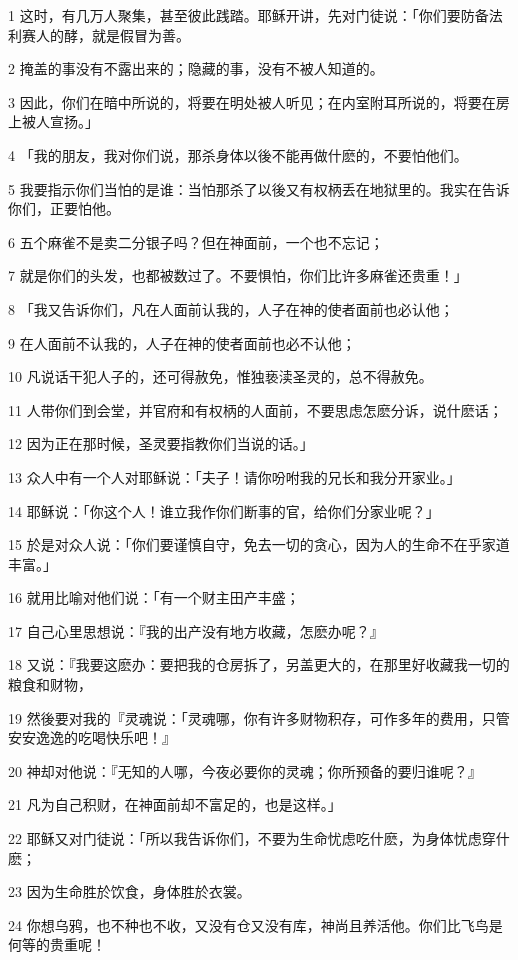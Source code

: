 \par 1 这时，有几万人聚集，甚至彼此践踏。耶稣开讲，先对门徒说：「你们要防备法利赛人的酵，就是假冒为善。
\par 2 掩盖的事没有不露出来的；隐藏的事，没有不被人知道的。
\par 3 因此，你们在暗中所说的，将要在明处被人听见；在内室附耳所说的，将要在房上被人宣扬。」
\par 4 「我的朋友，我对你们说，那杀身体以後不能再做什麽的，不要怕他们。
\par 5 我要指示你们当怕的是谁：当怕那杀了以後又有权柄丢在地狱里的。我实在告诉你们，正要怕他。
\par 6 五个麻雀不是卖二分银子吗？但在神面前，一个也不忘记；
\par 7 就是你们的头发，也都被数过了。不要惧怕，你们比许多麻雀还贵重！」
\par 8 「我又告诉你们，凡在人面前认我的，人子在神的使者面前也必认他；
\par 9 在人面前不认我的，人子在神的使者面前也必不认他；
\par 10 凡说话干犯人子的，还可得赦免，惟独亵渎圣灵的，总不得赦免。
\par 11 人带你们到会堂，并官府和有权柄的人面前，不要思虑怎麽分诉，说什麽话；
\par 12 因为正在那时候，圣灵要指教你们当说的话。」
\par 13 众人中有一个人对耶稣说：「夫子！请你吩咐我的兄长和我分开家业。」
\par 14 耶稣说：「你这个人！谁立我作你们断事的官，给你们分家业呢？」
\par 15 於是对众人说：「你们要谨慎自守，免去一切的贪心，因为人的生命不在乎家道丰富。」
\par 16 就用比喻对他们说：「有一个财主田产丰盛；
\par 17 自己心里思想说：『我的出产没有地方收藏，怎麽办呢？』
\par 18 又说：『我要这麽办：要把我的仓房拆了，另盖更大的，在那里好收藏我一切的粮食和财物，
\par 19 然後要对我的『灵魂说：「灵魂哪，你有许多财物积存，可作多年的费用，只管安安逸逸的吃喝快乐吧！』
\par 20 神却对他说：『无知的人哪，今夜必要你的灵魂；你所预备的要归谁呢？』
\par 21 凡为自己积财，在神面前却不富足的，也是这样。」
\par 22 耶稣又对门徒说：「所以我告诉你们，不要为生命忧虑吃什麽，为身体忧虑穿什麽；
\par 23 因为生命胜於饮食，身体胜於衣裳。
\par 24 你想乌鸦，也不种也不收，又没有仓又没有库，神尚且养活他。你们比飞鸟是何等的贵重呢！
